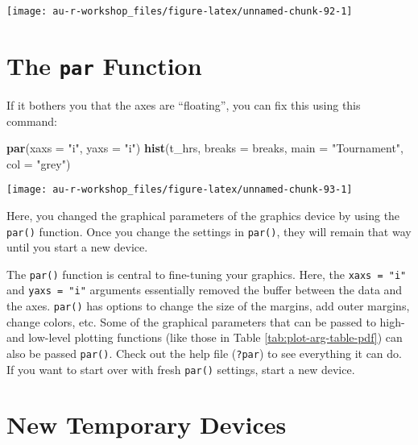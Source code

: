 \documentclass[]{book}
\newenvironment{Shaded}{\begin{snugshade}}{\end{snugshade}}
\newcommand{\KeywordTok}[1]{\textcolor[rgb]{0.13,0.29,0.53}{\textbf{#1}}}
\newcommand{\DataTypeTok}[1]{\textcolor[rgb]{0.13,0.29,0.53}{#1}}
\newcommand{\StringTok}[1]{\textcolor[rgb]{0.31,0.60,0.02}{#1}}
\newcommand{\NormalTok}[1]{#1}
\theoremstyle{definition}
\theoremstyle{definition}
\theoremstyle{definition}
\theoremstyle{remark}
\begin{document}
\begin{center}\texttt{[image: au-r-workshop\_files/figure-latex/unnamed-chunk-92-1]} \end{center}

\section{\texorpdfstring{The \texttt{par}
Function}{The par Function}}\label{the-par-function}

If it bothers you that the axes are ``floating'', you can fix this using
this command:

\begin{Shaded}
\begin{Highlighting}[]
\KeywordTok{par}\NormalTok{(}\DataTypeTok{xaxs =} \StringTok{"i"}\NormalTok{, }\DataTypeTok{yaxs =} \StringTok{"i"}\NormalTok{)}
\KeywordTok{hist}\NormalTok{(t_hrs, }\DataTypeTok{breaks =}\NormalTok{ breaks, }\DataTypeTok{main =} \StringTok{"Tournament"}\NormalTok{, }\DataTypeTok{col =} \StringTok{"grey"}\NormalTok{)}
\end{Highlighting}
\end{Shaded}

\begin{center}\texttt{[image: au-r-workshop\_files/figure-latex/unnamed-chunk-93-1]} \end{center}

Here, you changed the graphical parameters of the graphics device by
using the \texttt{par()} function. Once you change the settings in
\texttt{par()}, they will remain that way until you start a new device.

The \texttt{par()} function is central to fine-tuning your graphics.
Here, the \texttt{xaxs\ =\ "i"} and \texttt{yaxs\ =\ "i"} arguments
essentially removed the buffer between the data and the axes.
\texttt{par()} has options to change the size of the margins, add outer
margins, change colors, etc. Some of the graphical parameters that can
be passed to high- and low-level plotting functions (like those in Table
\ref{tab:plot-arg-table-pdf}) can also be passed \texttt{par()}. Check
out the help file (\texttt{?par}) to see everything it can do. If you
want to start over with fresh \texttt{par()} settings, start a new
device.

\section{New Temporary Devices}\label{new-temporary-devices}
\end{document}
